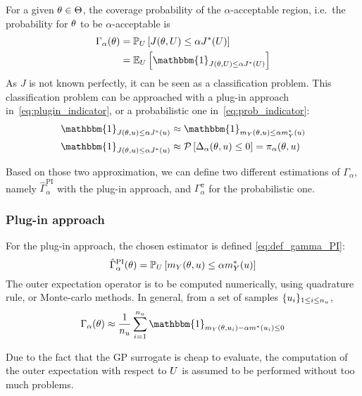 \documentclass[../../Main_ManuscritThese.tex]{subfiles}
\begin{document}
For a given $\theta\in\Theta$, the coverage probability of the $\alpha$-acceptable region, i.e.\ the probability for $\theta$ to be $\alpha$-acceptable is
\begin{align}
  \Gamma_{\alpha}(\kk) &= \Prob_{U}\left[J(\kk,\UU) \leq \alpha J^*(\UU)\right] \\
                              & =\Ex_{U}\left[\mathbbm{1}_{J(\kk,\UU) \leq \alpha J^*(\UU)}\right]
\end{align}
As $J$ is not known perfectly, it can be seen as a classification problem.
This classification problem can be approached with a plug-in approach in~\cref{eq:plugin_indicator}, or a probabilistic one in~\cref{eq:prob_indicator}:
\begin{align}
  \mathbbm{1}_{J(\kk,\uu) \leq \alpha J^*(\uu)} &\approx   \mathbbm{1}_{m_Y(\kk,\uu) \leq \alpha m_Y^*(\uu)} \label{eq:plugin_indicator} \\
  \mathbbm{1}_{J(\kk,\uu) \leq \alpha J^*(\uu)} &\approx   \ProbGP\left[ \Delta_{\alpha}(\kk,\uu) \leq 0 \right] = \pi_{\alpha}(\kk,\uu) \label{eq:prob_indicator}
\end{align}

Based on those two approximation, we can define two different estimations of $\Gamma_\alpha$, namely $\hat{\Gamma}_\alpha^{\mathrm{PI}}$ with the plug-in approach, and $\Gamma_{\alpha}^{\pi}$ for the probabilistic one.

\subsubsection{Plug-in approach}
For the plug-in approach, the chosen estimator is defined \cref{eq:def_gamma_PI}:
  \begin{equation}
    \label{eq:def_gamma_PI}
    \hat{\Gamma}_{\alpha}^{\mathrm{PI}}(\theta) = \mathbb{P}_U\left[m_Y(\theta,u) \leq \alpha m_Y^*(u) \right]
  \end{equation}
  The outer expectation operator is to be computed numerically, using quadrature rule, or Monte-carlo methods. In general, from a set of samples $\{u_i\}_{1\leq i \leq n_{u}}$,
  \begin{equation}
    \Gamma_{\alpha}(\kk) \approx \frac{1}{n_{\uu}}\sum_{i=1}^{n_{\uu}} \mathbbm{1}_{m_Y(\kk, \uu_i) - \alpha m^*(\uu_i)\leq 0}
  \end{equation}

  Due to the fact that the GP surrogate is cheap to evaluate, the computation of the outer expectation with respect to $U$ is assumed to be performed without too much problems.
\end{document}
